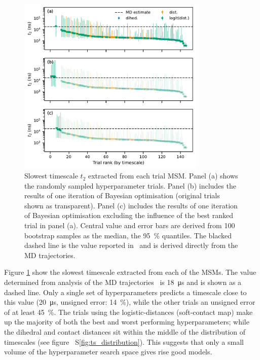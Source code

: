 \documentclass[journal=jacsat,manuscript=article]{achemso}
\newcommand*\sref[1]{%
    S\ref{#1}}
\begin{document}
\begin{figure}
    \centering
    \includegraphics[width=0.8\textwidth]{figures/1fme_timescales.pdf}
    \caption{Slowest timescale $t_{2}$ extracted from each trial MSM. Panel (a) shows the randomly sampled hyperparameter trials. Panel (b) includes the results of one iteration of Bayesian optimisation (original trials shown as transparent). Panel (c) includes the results of one iteration of Bayesian optimisation excluding the influence of the best ranked trial in panel (a).  Central value and error bars are derived from 100 bootstrap samples as the median, the \SI{95}{\percent} quantiles. The blacked dashed line is the value  reported in~\cite{lindorff-larsen_how_2011} and is derived directly from the MD trajectories.} 
    \label{fig:1fme_timescales}
\end{figure}

Figure \ref{fig:1fme_timescales} show the slowest timescale extracted from each of the MSMs. The value determined from analysis of the MD trajectories~\cite{lindorff-larsen_how_2011} is \SI{18}{\micro\second} and is shown as a dashed line. Only a single set of hyperparameters predicts a timescale close to this value (\SI{20}{\micro\second}, unsigned error: \SI{14}{\percent}), while the other trials an unsigned error of  at least \SI{45}{\percent}. The trials using the logistic-distances (soft-contact map) make up the majority of both the best and worst performing hyperparameters; while the dihedral and contact distances sit within the middle of the distribution of timescales (see figure~\sref{fig:ts_distribution}). This suggests that only a small volume of the hyperparameter search space gives rise good models.  
\end{document}

